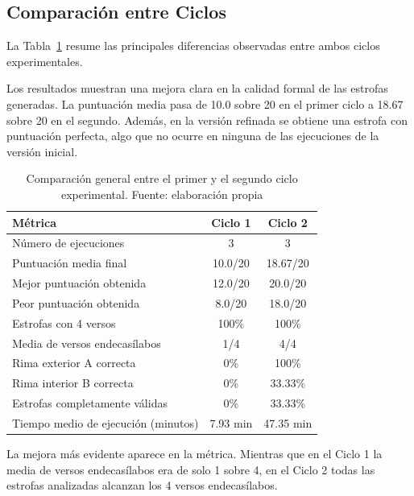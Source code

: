 \documentclass[12pt,a4paper,twoside,openright]{book}
\begin{document}
\subsection{Comparación entre Ciclos}

La Tabla~\ref{tab:comparativaCiclos} resume las principales diferencias observadas entre ambos ciclos experimentales.



Los resultados muestran una mejora clara en la calidad formal de las estrofas generadas. La puntuación media pasa de 10.0 sobre 20 en el primer ciclo a 18.67 sobre 20 en el segundo.
Además, en la versión refinada se obtiene una estrofa con puntuación perfecta, algo que no ocurre en ninguna de las ejecuciones de la versión inicial.

\begin{table}[h]
    \centering
    \begin{tabular}{|l|c|c|}
        \hline
        \textbf{Métrica} & \textbf{Ciclo 1} & \textbf{Ciclo 2} \\
        \hline
        Número de ejecuciones & 3 & 3 \\
        \hline
        Puntuación media final & 10.0/20 & 18.67/20 \\
        \hline
        Mejor puntuación obtenida & 12.0/20 & 20.0/20 \\
        \hline
        Peor puntuación obtenida & 8.0/20 & 18.0/20 \\
        \hline
        Estrofas con 4 versos & 100\% & 100\% \\
        \hline
        Media de versos endecasílabos & 1/4 & 4/4 \\
        \hline
        Rima exterior A correcta & 0\% & 100\% \\
        \hline
        Rima interior B correcta & 0\% & 33.33\% \\
        \hline
        Estrofas completamente válidas & 0\% & 33.33\% \\
        \hline
        Tiempo medio de ejecución (minutos) & 7.93 min & 47.35 min \\
        \hline
    \end{tabular}
    \caption{Comparación general entre el primer y el segundo ciclo experimental. Fuente: elaboración propia}
    \label{tab:comparativaCiclos}
\end{table}

La mejora más evidente aparece en la métrica. Mientras que en el Ciclo 1 la media de versos endecasílabos era de solo 1 sobre 4, en el Ciclo 2 todas las estrofas analizadas alcanzan los 4 versos endecasílabos.
\end{document}
